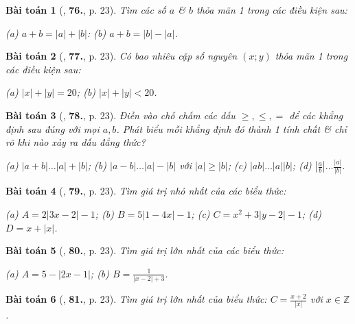 \documentclass{article}
\newtheorem{baitoan}{Bài toán}
\begin{document}
\begin{baitoan}[\cite{Binh_Toan_7_tap_1}, \textbf{76.}, p. 23]
	Tìm các số $a$ \& $b$ thỏa mãn 1 trong các điều kiện sau:
	
		(a) $a + b = |a| + |b|$:
		(b) $a + b = |b| - |a|$.
	
\end{baitoan}

\begin{baitoan}[\cite{Binh_Toan_7_tap_1}, \textbf{77.}, p. 23]
	Có bao nhiêu cặp số nguyên $(x;y)$ thỏa mãn 1 trong các điều kiện sau:
	
		(a) $|x| + |y| = 20$;
		(b) $|x| + |y| < 20$.
	
\end{baitoan}

\begin{baitoan}[\cite{Binh_Toan_7_tap_1}, \textbf{78.}, p. 23]
	Điền vào chỗ chấm các dấu $\ge,\le,=$ để các khẳng định sau đúng với mọi $a,b$. Phát biểu mỗi khẳng định đó thành 1 tính chất \& chỉ rõ khi nào xảy ra dấu đẳng thức?
	
		(a) $|a + b|\ldots|a| + |b|$;
		(b) $|a - b|\ldots|a| - |b|$ với $|a|\ge|b|$;
		(c) $|ab|\ldots|a||b|$;
		(d) $\left|\frac{a}{b}\right|\ldots\frac{|a|}{|b|}$.
	
\end{baitoan}

\begin{baitoan}[\cite{Binh_Toan_7_tap_1}, \textbf{79.}, p. 23]
	Tìm giá trị nhỏ nhất của các biểu thức:
	
		(a) $A = 2|3x - 2| - 1$;
		(b) $B = 5|1 - 4x| - 1$;
		(c) $C = x^2 + 3|y - 2| - 1$;
		(d) $D = x + |x|$.
	
\end{baitoan}

\begin{baitoan}[\cite{Binh_Toan_7_tap_1}, \textbf{80.}, p. 23]
	Tìm giá trị lớn nhất của các biểu thức:
	
		(a) $A = 5 - |2x - 1|$;
		(b) $B = \frac{1}{|x - 2| + 3}$.
	
\end{baitoan}

\begin{baitoan}[\cite{Binh_Toan_7_tap_1}, \textbf{81.}, p. 23]
	Tìm giá trị lớn nhất của biểu thức: $C = \frac{x + 2}{|x|}$ với $x\in\mathbb{Z}$.
\end{baitoan}

\end{document}
